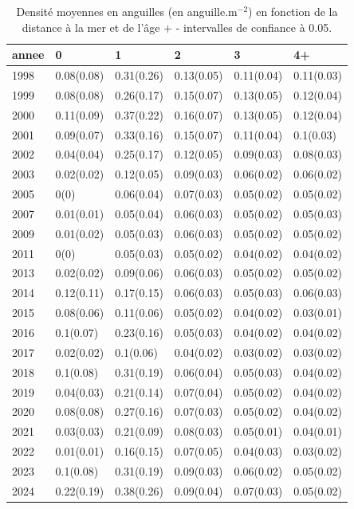 \begin{table}[htbp]
\centering
\caption[Densité âge et distance.]{Densité moyennes en anguilles (en anguille.m$^{-2}$) en fonction de la distance à la mer et de l'âge + - intervalles de confiance à 0.05.} 
\label{table_densite_age_annee}
\begin{tabular}{llllll}
  \hline
annee & 0 & 1 & 2 & 3 & 4+ \\ 
  \hline
1998 & 0.08(0.08) & 0.31(0.26) & 0.13(0.05) & 0.11(0.04) & 0.11(0.03) \\ 
  1999 & 0.08(0.08) & 0.26(0.17) & 0.15(0.07) & 0.13(0.05) & 0.12(0.04) \\ 
  2000 & 0.11(0.09) & 0.37(0.22) & 0.16(0.07) & 0.13(0.05) & 0.12(0.04) \\ 
  2001 & 0.09(0.07) & 0.33(0.16) & 0.15(0.07) & 0.11(0.04) & 0.1(0.03) \\ 
  2002 & 0.04(0.04) & 0.25(0.17) & 0.12(0.05) & 0.09(0.03) & 0.08(0.03) \\ 
  2003 & 0.02(0.02) & 0.12(0.05) & 0.09(0.03) & 0.06(0.02) & 0.06(0.02) \\ 
  2005 & 0(0) & 0.06(0.04) & 0.07(0.03) & 0.05(0.02) & 0.05(0.02) \\ 
  2007 & 0.01(0.01) & 0.05(0.04) & 0.06(0.03) & 0.05(0.02) & 0.05(0.03) \\ 
  2009 & 0.01(0.02) & 0.05(0.03) & 0.06(0.03) & 0.05(0.02) & 0.05(0.02) \\ 
  2011 & 0(0) & 0.05(0.03) & 0.05(0.02) & 0.04(0.02) & 0.04(0.02) \\ 
  2013 & 0.02(0.02) & 0.09(0.06) & 0.06(0.03) & 0.05(0.02) & 0.05(0.02) \\ 
  2014 & 0.12(0.11) & 0.17(0.15) & 0.06(0.03) & 0.05(0.03) & 0.06(0.03) \\ 
  2015 & 0.08(0.06) & 0.11(0.06) & 0.05(0.02) & 0.04(0.02) & 0.03(0.01) \\ 
  2016 & 0.1(0.07) & 0.23(0.16) & 0.05(0.03) & 0.04(0.02) & 0.04(0.02) \\ 
  2017 & 0.02(0.02) & 0.1(0.06) & 0.04(0.02) & 0.03(0.02) & 0.03(0.02) \\ 
  2018 & 0.1(0.08) & 0.31(0.19) & 0.06(0.04) & 0.05(0.03) & 0.04(0.02) \\ 
  2019 & 0.04(0.03) & 0.21(0.14) & 0.07(0.04) & 0.05(0.02) & 0.04(0.02) \\ 
  2020 & 0.08(0.08) & 0.27(0.16) & 0.07(0.03) & 0.05(0.02) & 0.04(0.02) \\ 
  2021 & 0.03(0.03) & 0.21(0.09) & 0.08(0.03) & 0.05(0.01) & 0.04(0.01) \\ 
  2022 & 0.01(0.01) & 0.16(0.15) & 0.07(0.05) & 0.04(0.03) & 0.03(0.02) \\ 
  2023 & 0.1(0.08) & 0.31(0.19) & 0.09(0.03) & 0.06(0.02) & 0.05(0.02) \\ 
  2024 & 0.22(0.19) & 0.38(0.26) & 0.09(0.04) & 0.07(0.03) & 0.05(0.02) \\ 
   \hline
\end{tabular}
\end{table}
